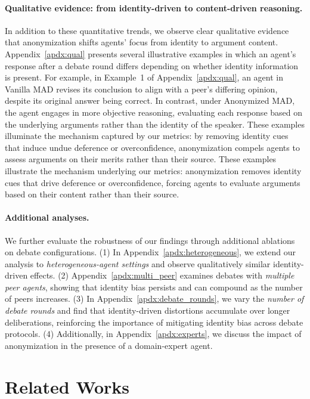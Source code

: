 \documentclass{article}
\begin{document}
\paragraph{Qualitative evidence: from identity-driven to content-driven reasoning.}
In addition to these quantitative trends, we observe clear qualitative evidence that anonymization shifts agents' focus from identity to argument content.
Appendix~\ref{apdx:qual} presents several illustrative examples in which an agent's response after a debate round differs depending on whether identity information is present.
For example, in Example~1 of Appendix~\ref{apdx:qual}, an agent in Vanilla MAD revises its conclusion to align with a peer's differing opinion, despite its original answer being correct.
In contrast, under Anonymized MAD, the agent engages in more objective reasoning, evaluating each response based on the underlying arguments rather than the identity of the speaker.
These examples illuminate the mechanism captured by our metrics: by removing identity cues that induce undue deference or overconfidence, anonymization compels agents to assess arguments on their merits rather than their source.
These examples illustrate the mechanism underlying our metrics: anonymization removes identity cues that drive deference or overconfidence, forcing agents to evaluate arguments based on their content rather than their source.



\paragraph{Additional analyses.} We further evaluate the robustness of our findings through additional ablations on debate configurations. (1) In Appendix~\ref{apdx:heterogeneous}, we extend our analysis to \emph{heterogeneous-agent settings} and observe qualitatively similar identity-driven effects. (2) Appendix~\ref{apdx:multi_peer} examines debates with \emph{multiple peer agents}, showing that identity bias persists and can compound as the number of peers increases. (3) In Appendix~\ref{apdx:debate_rounds}, we vary the \emph{number of debate rounds} and find that identity-driven distortions accumulate over longer deliberations, reinforcing the importance of mitigating identity bias across debate protocols. (4) Additionally, in Appendix~\ref{apdx:experts}, we discuss the impact of anonymization in the presence of a domain-expert agent.
% 

\section{Related Works}
\end{document}
